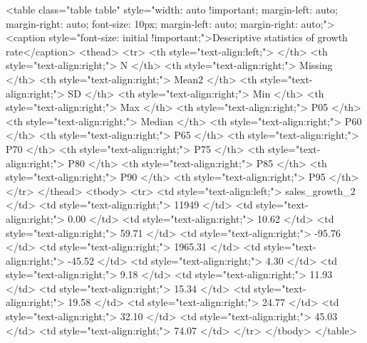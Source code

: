 <table class="table table" style="width: auto !important; margin-left: auto; margin-right: auto; font-size: 10px; margin-left: auto; margin-right: auto;">
<caption style="font-size: initial !important;">Descriptive statistics of growth rate</caption>
 <thead>
  <tr>
   <th style="text-align:left;">   </th>
   <th style="text-align:right;"> N </th>
   <th style="text-align:right;"> Missing </th>
   <th style="text-align:right;"> Mean2 </th>
   <th style="text-align:right;"> SD </th>
   <th style="text-align:right;"> Min </th>
   <th style="text-align:right;"> Max </th>
   <th style="text-align:right;"> P05 </th>
   <th style="text-align:right;"> Median </th>
   <th style="text-align:right;"> P60 </th>
   <th style="text-align:right;"> P65 </th>
   <th style="text-align:right;"> P70 </th>
   <th style="text-align:right;"> P75 </th>
   <th style="text-align:right;"> P80 </th>
   <th style="text-align:right;"> P85 </th>
   <th style="text-align:right;"> P90 </th>
   <th style="text-align:right;"> P95 </th>
  </tr>
 </thead>
<tbody>
  <tr>
   <td style="text-align:left;"> sales_growth_2 </td>
   <td style="text-align:right;"> 11949 </td>
   <td style="text-align:right;"> 0.00 </td>
   <td style="text-align:right;"> 10.62 </td>
   <td style="text-align:right;"> 59.71 </td>
   <td style="text-align:right;"> -95.76 </td>
   <td style="text-align:right;"> 1965.31 </td>
   <td style="text-align:right;"> -45.52 </td>
   <td style="text-align:right;"> 4.30 </td>
   <td style="text-align:right;"> 9.18 </td>
   <td style="text-align:right;"> 11.93 </td>
   <td style="text-align:right;"> 15.34 </td>
   <td style="text-align:right;"> 19.58 </td>
   <td style="text-align:right;"> 24.77 </td>
   <td style="text-align:right;"> 32.10 </td>
   <td style="text-align:right;"> 45.03 </td>
   <td style="text-align:right;"> 74.07 </td>
  </tr>
</tbody>
</table>